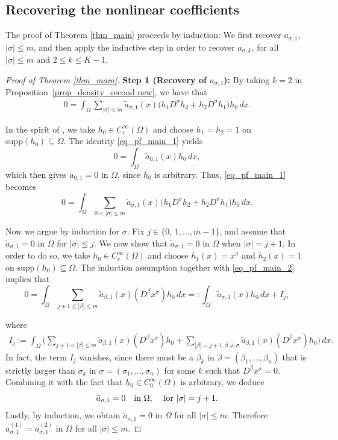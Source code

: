 \documentclass [oneside,11pt] {amsart}
\numberwithin{equation}{section}
\newcommand{\supp}{\mathrm{supp}}
\newcommand{\dx}{\,dx}
\begin{document}
\subsection{Recovering the nonlinear coefficients}

The proof of Theorem \ref{thm_main} proceeds by induction: We first recover $a_{\sigma,1}$, $|\sigma|\le m$, and then apply the inductive step in order to recover $a_{\sigma,k}$, for all $|\sigma|\le m$ and $2\le k\le K-1$.
\begin{proof}[Proof of Theorem \ref{thm_main}] 

{\bf Step 1 (Recovery of $a_{\sigma,1}$):}
By taking $k=2$ in Proposition~\ref{prop_density_second new}, we have that
\begin{align}\label{eq_pf_main_1}
0 = \int_\Omega \sum_{|\sigma|\le m} \widetilde{a}_{\sigma,1}(x) \Big( h_{1}D^\sigma h_{{2}}+{h_{2}}D^\sigma{h_{1}} \Big) h_0 \dx.
\end{align}
 
In the spirit of
\cite[Section 3]{CMRU22}, 
we take $h_0\in C_c^\infty(\Omega)$ and choose
$h_1 = h_2 = 1$ on $\supp (h_0)\subseteq \Omega$. The identity \eqref{eq_pf_main_1} yields 
\[
0= \int_\Omega \widetilde{a}_{0,1}(x)h_0 \dx,
\]
which then gives $\widetilde{a}_{0,1}=0$ in $\Omega$, since $h_0$ is arbitrary. Thus, \eqref{eq_pf_main_1} becomes
\begin{equation}\label{eq_pf_main_2}
0 = \int_\Omega \sum_{0<|\sigma|\le m} \widetilde{a}_{\sigma,1}(x) \Big( h_{1}D^\sigma h_{{2}}+{h_{2}}D^\sigma{h_{1}} \Big) h_0 \dx.
\end{equation}

Now we argue by induction for $\sigma$. Fix $j\in \{0,\,1,\ldots, m-1\}$, and assume that $\widetilde{a}_{\sigma,1} = 0 $ in $\Omega$ for $|\sigma|\le j$. We now show that $\widetilde{a}_{\sigma,1} = 0 $ in $\Omega$ when $|\sigma|=j+1$.
In order to do so, we take $h_0\in C_c^\infty(\Omega)$ and choose
$h_1(x)= x^\sigma$ and $ h_2(x) = 1$ on $\supp (h_0)\subseteq \Omega$. The induction assumption together with \eqref{eq_pf_main_2} implies that
\[
0= \int_\Omega \sum_{j+1 \le|\beta|\le m} \widetilde{a}_{\beta,1}(x) (D^\beta x^\sigma) h_0 \dx=:\int_\Omega \widetilde{a}_{\sigma,1}(x) h_0 \dx+I_j,
\]

where 
\[
\begin{aligned}
I_j:=\int_\Omega\Big(\sum_{j+1<|\beta|\le m} \widetilde{a}_{\beta,1}(x) (D^\beta x^\sigma) h_0 +\sum_{|\beta|=j+1,\beta\neq\sigma} \widetilde{a}_{\beta,1}(x) (D^\beta x^\sigma) h_0 \Big)\dx.
\end{aligned}
\]
In fact, the term $I_j$ vanishes, since there must be a $\beta_k$ in $\beta= (\beta_1, \ldots, \beta_n)$ that is strictly larger than $\sigma_k$ in $\sigma=(\sigma_1,\ldots, \sigma_n)$ for some $k$ such that $D^\beta x^\sigma=0$. Combining it with the fact that $h_0\in C^\infty_0(\Omega)$ is arbitrary, we deduce  
$$
\widetilde{a}_{\sigma
,1} =0\quad \hbox{in $\Omega$, \quad for $|\sigma|=j+1$}.
$$
Lastly, by induction, we obtain $\widetilde{a}_{\sigma,1} = 0$ in $\Omega$ for all $|\sigma|\le m$. Therefore $a_{\sigma,1}^{(1)}=a_{\sigma,1}^{(2)}$ in $\Omega$ for all $|\sigma|\le m$.  
\end{proof}
\end{document}
